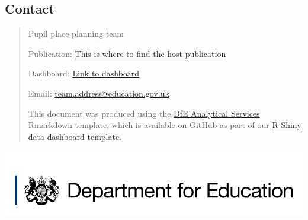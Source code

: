 \documentclass[
]{article}
\begin{document}
\hypertarget{contact}{%
\subsection{Contact}\label{contact}}

\begin{quote}
Pupil place planning team

Publication:
\href{https://explore-education-statistics.service.gov.uk/find-statistics/}{This
is where to find the host publication}

Dashboard:
\href{https://department-for-education.shinyapps.io/childrens_social_services_offenders_dashboard}{Link
to dashboard}

Email:
\href{mailto:\%3Cteam.address\%3E@education.gov.uk}{team.address@education.gov.uk}

This document was produced using the
\href{https://github.com/dfe-analytical-services}{DfE Analytical
Services} Rmarkdown template, which is available on GitHub as part of
our
\href{https://github.com/dfe-analytical-services/shiny-template}{R-Shiny
data dashboard template}.
\end{quote}

\href{https://www.gov.uk/government/organisations/department-for-education}{\includegraphics[width=0.50\linewidth]{"images/Department_for_Education_long.png"}}
\end{document}
